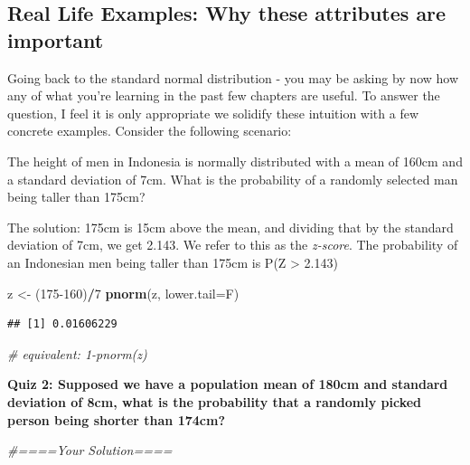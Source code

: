 \documentclass[]{article}
\newenvironment{Shaded}{\begin{snugshade}}{\end{snugshade}}
\newcommand{\CommentTok}[1]{\textcolor[rgb]{0.56,0.35,0.01}{\textit{#1}}}
\newcommand{\DataTypeTok}[1]{\textcolor[rgb]{0.13,0.29,0.53}{#1}}
\newcommand{\DecValTok}[1]{\textcolor[rgb]{0.00,0.00,0.81}{#1}}
\newcommand{\KeywordTok}[1]{\textcolor[rgb]{0.13,0.29,0.53}{\textbf{#1}}}
\newcommand{\NormalTok}[1]{#1}
\newcommand{\OperatorTok}[1]{\textcolor[rgb]{0.81,0.36,0.00}{\textbf{#1}}}
\newcommand{\StringTok}[1]{\textcolor[rgb]{0.31,0.60,0.02}{#1}}
\begin{document}
\hypertarget{real-life-examples-why-these-attributes-are-important}{%
\subsection{Real Life Examples: Why these attributes are
important}\label{real-life-examples-why-these-attributes-are-important}}

Going back to the standard normal distribution - you may be asking by
now how any of what you're learning in the past few chapters are useful.
To answer the question, I feel it is only appropriate we solidify these
intuition with a few concrete examples. Consider the following scenario:

The height of men in Indonesia is normally distributed with a mean of
160cm and a standard deviation of 7cm. What is the probability of a
randomly selected man being taller than 175cm?

The solution: 175cm is 15cm above the mean, and dividing that by the
standard deviation of 7cm, we get 2.143. We refer to this as the
\emph{z-score}. The probability of an Indonesian men being taller than
175cm is P(Z \textgreater{} 2.143)

\begin{Shaded}
\begin{Highlighting}[]
\NormalTok{z <-}\StringTok{ }\NormalTok{(}\DecValTok{175-160}\NormalTok{)}\OperatorTok{/}\DecValTok{7}
\KeywordTok{pnorm}\NormalTok{(z, }\DataTypeTok{lower.tail=}\NormalTok{F)}
\end{Highlighting}
\end{Shaded}

\begin{verbatim}
## [1] 0.01606229
\end{verbatim}

\begin{Shaded}
\begin{Highlighting}[]
\CommentTok{# equivalent: 1-pnorm(z)}
\end{Highlighting}
\end{Shaded}

\textbf{Quiz 2: Supposed we have a population mean of 180cm and standard
deviation of 8cm, what is the probability that a randomly picked person
being shorter than 174cm?}

\begin{Shaded}
\begin{Highlighting}[]
\CommentTok{#====Your Solution====}
\end{Highlighting}
\end{Shaded}
\end{document}
